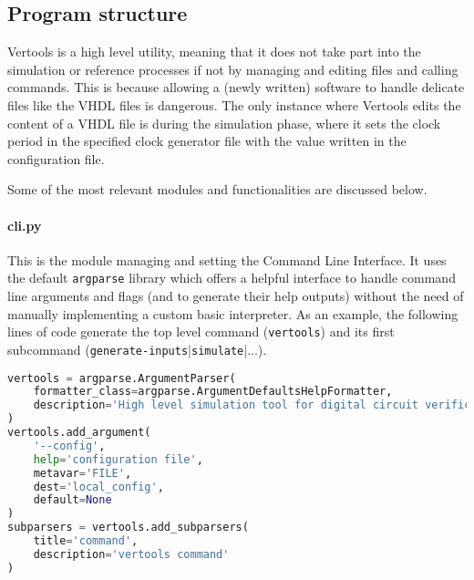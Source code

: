 \subsection{Program structure}
Vertools is a high level utility, meaning that it does not take part into the simulation or reference processes if not by managing and editing files and calling commands. This is because allowing a (newly written) software to handle delicate files like the VHDL files is dangerous.
The only instance where Vertools edits the content of a VHDL file is during the simulation phase, where it sets the clock period in the specified clock generator file with the value written in the configuration file.

Some of the most relevant modules and functionalities are discussed below.

\paragraph{cli.py} This is the module managing and setting the Command Line Interface. It uses the default \texttt{argparse} library which offers a helpful interface to handle command line arguments and flags (and to generate their help outputs) without the need of manually implementing a custom basic interpreter. As an example, the following lines of code generate the top level command (\texttt{vertools}) and its first subcommand (\texttt{generate-inputs}|\texttt{simulate}|...).
\begin{lstlisting}[language=Python, keywords={None}]
vertools = argparse.ArgumentParser(
    formatter_class=argparse.ArgumentDefaultsHelpFormatter,
    description='High level simulation tool for digital circuit verification'
)
vertools.add_argument(
    '--config',
    help='configuration file',
    metavar='FILE',
    dest='local_config',
    default=None
)
subparsers = vertools.add_subparsers(
    title='command',
    description='vertools command'
)
\end{lstlisting}

